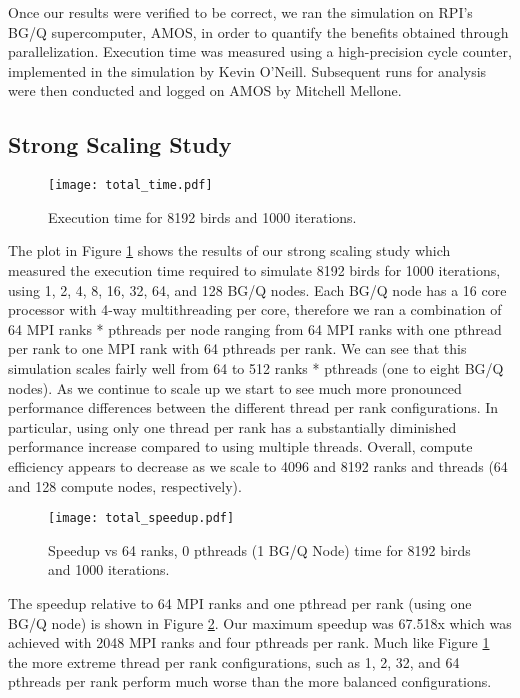 Once our results were verified to be correct, we ran the simulation on
RPI's BG/Q supercomputer, AMOS, in order to quantify the benefits
obtained through parallelization. Execution time was measured using a
high-precision cycle counter, implemented in the simulation by Kevin
O'Neill. Subsequent runs for analysis were then conducted and logged
on AMOS by Mitchell Mellone.

\subsection*{Strong Scaling Study}
\begin{figure}[h!]
  \centering
  \texttt{[image: total\_time.pdf]}
  \caption{Execution time for 8192 birds and 1000 iterations.\label{fig:total}}
\end{figure}

The plot in Figure \ref{fig:total} shows the results of our strong
scaling study which measured the execution time required to simulate
8192 birds for 1000 iterations, using 1, 2, 4, 8, 16, 32, 64, and 128
BG/Q nodes. Each BG/Q node has a 16 core processor with 4-way
multithreading per core, therefore we ran a combination of 64 MPI
ranks * pthreads per node ranging from 64 MPI ranks with one pthread
per rank to one MPI rank with 64 pthreads per rank. We can see that
this simulation scales fairly well from 64 to 512 ranks * pthreads
(one to eight BG/Q nodes). As we continue to scale up we start to see
much more pronounced performance differences between the different
thread per rank configurations. In particular, using only one thread
per rank has a substantially diminished performance increase compared
to using multiple threads. Overall, compute efficiency appears to
decrease as we scale to 4096 and 8192 ranks and threads (64 and 128
compute nodes, respectively).

\begin{figure}[h!]
  \centering
  \texttt{[image: total\_speedup.pdf]}
  \caption{Speedup vs 64 ranks, 0 pthreads (1 BG/Q Node) time for 8192
    birds and 1000 iterations.\label{fig:totalspeedup}}
\end{figure}

The speedup relative to 64 MPI ranks and one pthread per rank (using
one BG/Q node) is shown in Figure \ref{fig:totalspeedup}. Our maximum
speedup was 67.518x which was achieved with 2048 MPI ranks and four
pthreads per rank. Much like Figure \ref{fig:total} the more extreme
thread per rank configurations, such as 1, 2, 32, and 64 pthreads per
rank perform much worse than the more balanced configurations.

